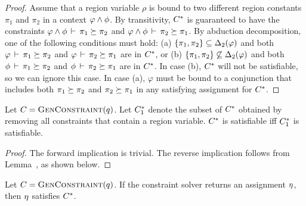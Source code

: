 \begin{proof}
  Assume that a region variable $\rho$ is bound to two different
  region constants $\pi_1$ and $\pi_2$ in a context $\varphi \wedge \phi$.
  By transitivity, ${C}^*$ is guaranteed to have the constraints
  $\varphi \wedge \phi\,\vdash\,\pi_1 \succeq \pi_2$
  and $\varphi \wedge \phi\,\vdash\,\pi_2 \succeq \pi_1$.
  By abduction decomposition, one of the following conditions must hold:
  (a) $\{ \pi_1, \pi_2 \} \subseteq {\Delta_2}(\varphi)$ and
  both $\varphi\,\vdash\,\pi_1 \succeq \pi_2$ and
  $\varphi\,\vdash\,\pi_2 \succeq \pi_1$ are in ${C}^*$, or
  (b) $\{ \pi_1, \pi_2 \} \not\subseteq {\Delta_2}(\varphi)$ and
  both $\phi\,\vdash\,\pi_1 \succeq \pi_2$ and
  $\phi\,\vdash\,\pi_2 \succeq \pi_1$ are in ${C}^*$.
  In case (b), ${C}^*$ will not be satisfiable, so we can ignore this case.
  In case (a), $\varphi$ must be bound to a conjunction that includes both
  $\pi_1 \succeq \pi_2$ and $\pi_2 \succeq \pi_1$ in any satisfying assignment
  for ${C}^*$.
\end{proof}

\begin{lemma}
Let $C = \textsc{GenConstraint}(q)$.
Let ${C}^*_1$ denote the subset of ${C}^*$ obtained by removing all constraints
that contain a region variable.
${C}^*$ is satisfiable iff ${C}^*_1$ is satisfiable.
\end{lemma}

\begin{proof}
  The forward implication is trivial.
  The reverse implication follows from Lemma~\label{lemma:completely-bound}, as shown below.


\end{proof}

\begin{theorem}
\label{thm:constraint-solver-soundness}
Let $C = \textsc{GenConstraint}(q)$.
If the constraint solver returns an assignment $\eta$,
then $\eta$ satisfies ${C}^*$.
\end{theorem}

